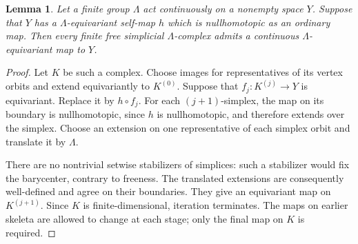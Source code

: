\documentclass[11pt]{amsart}
\newtheorem{lemma}[theorem]{Lemma}
\theoremstyle{definition}
\theoremstyle{remark}
\numberwithin{equation}{section}
\begin{document}
\begin{lemma}\label{lem:skeletal}
Let a finite group $\Lambda$ act continuously on a nonempty space $Y$. Suppose that $Y$ has a $\Lambda$-equivariant self-map $h$ which is nullhomotopic as an ordinary map. Then every finite free simplicial $\Lambda$-complex admits a continuous $\Lambda$-equivariant map to $Y$.
\end{lemma}
\begin{proof}
Let $K$ be such a complex. Choose images for representatives of its vertex orbits and extend equivariantly to $K^{(0)}$. Suppose that $f_j:K^{(j)}\to Y$ is equivariant. Replace it by $h\circ f_j$. For each $(j+1)$-simplex, the map on its boundary is nullhomotopic, since $h$ is nullhomotopic, and therefore extends over the simplex. Choose an extension on one representative of each simplex orbit and translate it by $\Lambda$.

There are no nontrivial setwise stabilizers of simplices: such a stabilizer would fix the barycenter, contrary to freeness. The translated extensions are consequently well-defined and agree on their boundaries. They give an equivariant map on $K^{(j+1)}$. Since $K$ is finite-dimensional, iteration terminates. The maps on earlier skeleta are allowed to change at each stage; only the final map on $K$ is required.
\end{proof}
\end{document}
